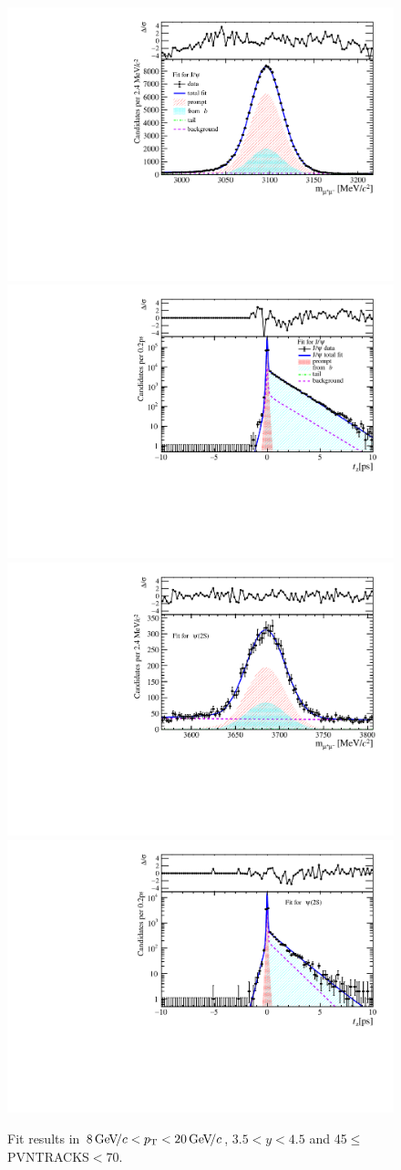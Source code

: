 \begin{figure}[H]
\begin{center}
\includegraphics[width=0.47\linewidth]{pdf/Jpsi/drawmass/n3y3pt5.pdf}
\includegraphics[width=0.47\linewidth]{pdf/Jpsi/2DFit/n3y3pt5.pdf}
\vspace*{-0.5cm}
\includegraphics[width=0.47\linewidth]{pdf/Psi2S/drawmass/n3y3pt5.pdf}
\includegraphics[width=0.47\linewidth]{pdf/Psi2S/2DFit/n3y3pt5.pdf}
\vspace*{-0.5cm}
\end{center}
\caption{Fit results in $8\text{\,Ge\kern -0.1em V\!/}c<p_{\mathrm{T}}<20\text{\,Ge\kern -0.1em V\!/}c$, $3.5<y<4.5$ and 45$\leq$PVNTRACKS$<$70.}
\label{Fitn3y3pt5}
\end{figure}
